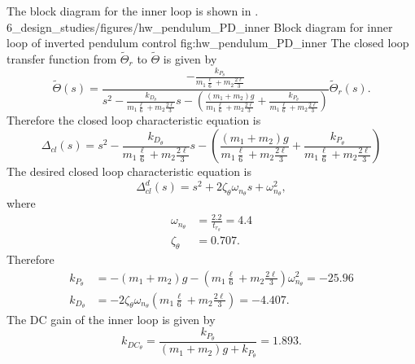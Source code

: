 The block diagram for the inner loop is shown in .
	{6_design_studies/figures/hw_pendulum_PD_inner}
	{Block diagram for inner loop of inverted pendulum control}
	{fig:hw_pendulum_PD_inner}
The closed loop transfer function from $\tilde{\Theta}_r$ to $\tilde{\Theta}$ is given by
\[
\tilde{\Theta}(s) = \frac{-\frac{k_{P_\theta}}{m_1 \frac{\ell}{6} +m_2\frac{2\ell}{3}}}{s^2 - \frac{k_{D_\theta}}{m_1 \frac{\ell}{6} +m_2\frac{2\ell}{3}}s-\left(\frac{(m_1+m_2)g}{m_1 \frac{\ell}{6} +m_2\frac{2\ell}{3}}+\frac{k_{P_\theta}}{m_1 \frac{\ell}{6} +m_2\frac{2\ell}{3}}\right)} \tilde{\Theta}_r(s).
\]
Therefore the closed loop characteristic equation is
\[
\Delta_{cl}(s) =s^2 - \frac{k_{D_\theta}}{m_1 \frac{\ell}{6} +m_2\frac{2\ell}{3}}s-\left(\frac{(m_1+m_2)g}{m_1 \frac{\ell}{6} +m_2\frac{2\ell}{3}}+\frac{k_{P_\theta}}{m_1 \frac{\ell}{6} +m_2\frac{2\ell}{3}}\right)
\]
The desired closed loop characteristic equation is
\[
\Delta_{cl}^d(s) = s^2 + 2\zeta_{\theta}\omega_{n_\theta} s + \omega_{n_\theta}^2,
\]
where
\begin{align*}
\omega_{n_\theta} &= \frac{2.2}{t_{r_\theta}} = 4.4 \\
\zeta_{\theta} &= 0.707.
\end{align*}
Therefore
\begin{align*}
k_{P_\theta} &= -(m_1+m_2)g - (m_1 \frac{\ell}{6} +m_2\frac{2\ell}{3})\omega_{n_\theta}^2 = -25.96 \\
k_{D_\theta} &= -2\zeta_{\theta}\omega_{n_\theta} (m_1 \frac{\ell}{6} +m_2\frac{2\ell}{3}) = -4.407.
\end{align*}
The DC gain of the inner loop is given by
\[
k_{DC_{\theta}} = \frac{k_{P_\theta}}{(m_1+m_2)g+k_{P_\theta}} = 1.893.
\]

